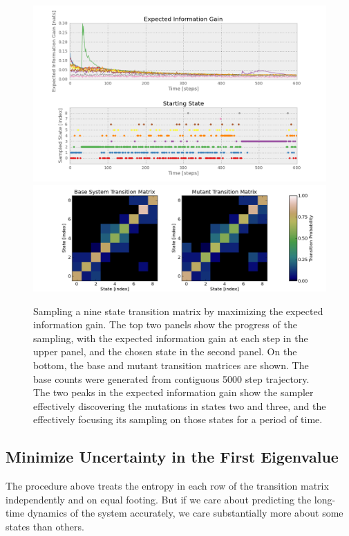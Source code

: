 \documentclass[twocolumn,floatfix,nofootinbib,aps]{revtex4-1}
\begin{document}
\begin{figure}[h]
\centering
\includegraphics[width=7in]{code/9x9graph/plots/information_gain.png}
\includegraphics[width=7in]{code/9x9graph/plots/transition_matricies.png}
\caption{Sampling a nine state transition matrix by maximizing the expected information gain. The top two panels show the progress of the sampling, with the expected information gain at each step in the upper panel, and the chosen state in the second panel. On the bottom, the base and mutant transition matrices are shown. The base counts were generated from contiguous 5000 step trajectory. The two peaks in the expected information gain show the sampler effectively discovering the mutations in states two and three, and the effectively focusing its sampling on those states for a period of time.}
\end{figure}

\subsection{Minimize Uncertainty in the First Eigenvalue}

The procedure above treats the entropy in each row of the transition matrix independently and on equal footing. But if we care about predicting the long-time dynamics of the system accurately, we care substantially more about some states than others.
\end{document}

